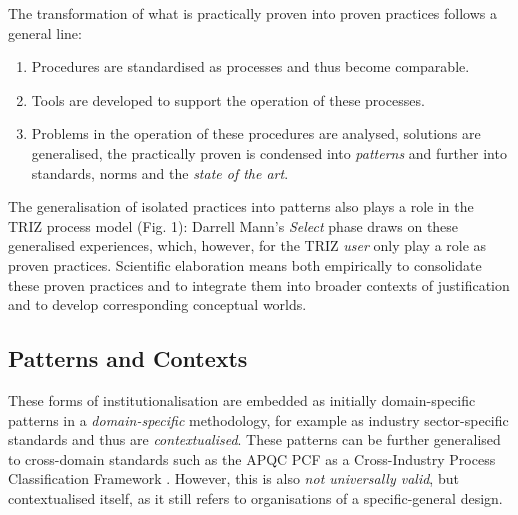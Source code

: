 \documentclass[11pt,a4paper]{article}
\begin{document}
The transformation of what is practically proven into proven practices follows
a general line:
\begin{enumerate}
\item Procedures are standardised as processes and thus become comparable.
\item Tools are developed to support the operation of these processes.
\item Problems in the operation of these procedures are analysed, solutions
  are generalised, the practically proven is condensed into \emph{patterns}
  and further into standards, norms and the \emph{state of the art}.
\end{enumerate}
The generalisation of isolated practices into patterns also plays a role in
the TRIZ process model (Fig. 1): Darrell Mann's \emph{Select} phase draws on
these generalised experiences, which, however, for the TRIZ \emph{user} only
play a role as proven practices. Scientific elaboration means both empirically
to consolidate these proven practices and to integrate them into broader
contexts of justification and to develop corresponding conceptual worlds.

\subsection{Patterns and Contexts}

These forms of institutionalisation are embedded as initially domain-specific
patterns in a \emph{domain-specific} methodology, for example as industry
sector-specific standards and thus are \emph{contextualised}.  These patterns
can be further generalised to cross-domain standards such as the APQC PCF as a
Cross-Industry Process Classification Framework \cite{APQC}.  However, this is
also \emph{not universally valid}, but contextualised itself, as it still
refers to organisations of a specific-general design.
\end{document}

